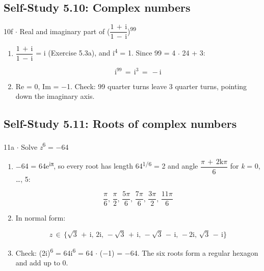 \documentclass[11pt]{article}
\begin{document}
\begin{keepsection}\subsection{Self-Study 5.10: Complex numbers}

\begin{workedbox}{10f \ensuremath{\cdot} Real and imaginary part of ({\small\ensuremath{\dfrac{1\, +\, \mathrm{i}}{1\, -\, \mathrm{i}}}})\textsuperscript{99}}
\begin{enumerate}
\item {}
{\small\ensuremath{\dfrac{1\, +\, \mathrm{i}}{1\, -\, \mathrm{i}}}} = i (Exercise 5.3a), and i\textsuperscript{4} = 1. Since 99 = 4 \ensuremath{\cdot} 24 + 3:

\begin{equation*}\mathrm{i}^{99}\, =\, \mathrm{i}^{3}\, =\, -\mathrm{i}\end{equation*}
\item Re = 0, Im = \ensuremath{-}1. Check: 99 quarter turns leave 3 quarter turns, pointing down the imaginary axis.
\end{enumerate}
\end{workedbox}

\end{keepsection}
\begin{keepsection}\subsection{Self-Study 5.11: Roots of complex numbers}

\begin{workedbox}{11a \ensuremath{\cdot} Solve \textit{z}\textsuperscript{6} = \ensuremath{-}64}
\begin{enumerate}
\item {}
\ensuremath{-}64 = 64e\textsuperscript{iπ}, so every root has length 64\textsuperscript{1/6} = 2 and angle {\small\ensuremath{\dfrac{π\, +\, 2\mathrm{k}π}{6}}} for \textit{k} = 0, …, 5:

\begin{equation*}\dfrac{π}{6},\, \dfrac{π}{2},\, \dfrac{5π}{6},\, \dfrac{7π}{6},\, \dfrac{3π}{2},\, \dfrac{11π}{6}\end{equation*}
\item {}
In normal form:

\begin{equation*}{z}\, \in \, \{\sqrt{3}\, +\, \mathrm{i},\, 2\mathrm{i},\, -\sqrt{3}\, +\, \mathrm{i},\, -\sqrt{3}\, -\, \mathrm{i},\, -2\mathrm{i},\, \sqrt{3}\, -\, \mathrm{i}\}\end{equation*}
\item Check: (2i)\textsuperscript{6} = 64i\textsuperscript{6} = 64 \ensuremath{\cdot} (\ensuremath{-}1) = \ensuremath{-}64. The six roots form a regular hexagon and add up to 0.
\end{enumerate}
\end{workedbox}

\end{keepsection}
\end{document}
